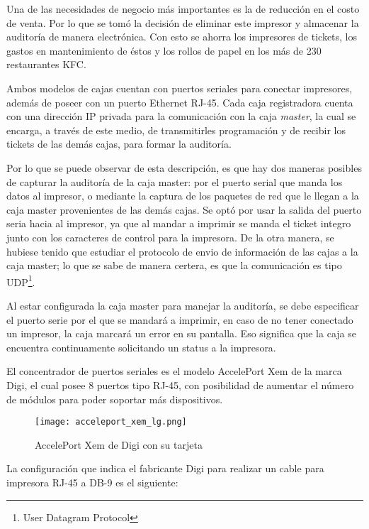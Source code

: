 Una de las necesidades de negocio más importantes es la de reducción en el costo de venta. Por lo que se tomó la decisión de eliminar este impresor y almacenar la auditoría de manera electrónica. Con esto se ahorra los impresores de tickets, los gastos en mantenimiento de éstos y los rollos de papel en los más de 230 restaurantes KFC.

Ambos modelos de cajas cuentan con puertos seriales para conectar impresores, además de poseer con un puerto Ethernet RJ-45. Cada caja registradora cuenta con una dirección IP privada para la comunicación con la caja \textit{master}, la cual se encarga, a través de este medio, de transmitirles programación y de recibir los tickets de las demás cajas, para formar la auditoría. 

Por lo que se puede observar de esta descripción, es que hay dos maneras posibles de capturar la auditoría de la caja master: por el puerto serial que manda los datos al impresor, o mediante la captura de los paquetes de red que le llegan a la caja master provenientes de las demás cajas. Se optó por usar la salida del puerto seria hacia al impresor, ya que al mandar a imprimir se manda el ticket integro junto con los caracteres de control para la impresora. De la otra manera, se hubiese tenido que estudiar el protocolo de envio de información de las cajas a la caja master; lo que se sabe de manera certera, es que la comunicación es tipo UDP\footnote{User Datagram Protocol}.

Al estar configurada la caja master para manejar la auditoría, se debe especificar el puerto serie por el que se mandará a imprimir, en caso de no tener conectado un impresor, la caja marcará un error en su pantalla. Eso significa que la caja se encuentra continuamente solicitando un status a la impresora.

El concentrador de puertos seriales es el modelo AccelePort  Xem de la marca Digi, el cual posee 8 puertos tipo RJ-45, con posibilidad de aumentar el número de módulos para poder soportar más dispositivos.

\begin{figure}[htb]
 \begin{center}
  \texttt{[image: acceleport\_xem\_lg.png]}
 \end{center}
 \caption{AccelePort Xem de Digi con su tarjeta}
 \label{fig:digi}
\end{figure}

La configuración que indica el fabricante Digi para realizar un cable para impresora RJ-45 a DB-9 es el siguiente:


